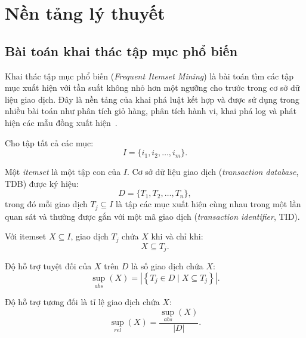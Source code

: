 \section{Nền tảng lý thuyết}
\label{sec:theoretical-background}

\subsection{Bài toán khai thác tập mục phổ biến}

Khai thác tập mục phổ biến (\textit{Frequent Itemset Mining}) là bài toán
tìm các tập mục xuất hiện với tần suất không nhỏ hơn một ngưỡng cho trước trong
cơ sở dữ liệu giao dịch. Đây là nền tảng của khai phá luật kết hợp và được sử
dụng trong nhiều bài toán như phân tích giỏ hàng, phân tích hành vi, khai phá log
và phát hiện các mẫu đồng xuất hiện~\cite{agrawal1994fast,han2011datamining}.

Cho tập tất cả các mục:
\begin{equation}
    I = \{i_1,i_2,\ldots,i_m\}.
    \label{eq:item-universe}
\end{equation}

Một \textit{itemset} là một tập con của $I$. Cơ sở dữ liệu giao dịch
(\textit{transaction database}, TDB) được ký hiệu:
\begin{equation}
    D = \{T_1,T_2,\ldots,T_n\},
    \label{eq:transaction-database}
\end{equation}
trong đó mỗi giao dịch $T_j \subseteq I$ là tập các mục xuất hiện cùng nhau
trong một lần quan sát và thường được gắn với một mã giao dịch
(\textit{transaction identifier}, TID).

Với itemset $X \subseteq I$, giao dịch $T_j$ chứa $X$ khi và chỉ khi:
\begin{equation}
    X \subseteq T_j.
    \label{eq:transaction-contains-itemset}
\end{equation}

Độ hỗ trợ tuyệt đối của $X$ trên $D$ là số giao dịch chứa $X$:
\begin{equation}
    \operatorname{sup}_{abs}(X)
    =
    \left|\left\{T_j \in D \mid X \subseteq T_j\right\}\right|.
    \label{eq:absolute-support}
\end{equation}

Độ hỗ trợ tương đối là tỉ lệ giao dịch chứa $X$:
\begin{equation}
    \operatorname{sup}_{rel}(X)
    =
    \frac{\operatorname{sup}_{abs}(X)}{|D|}.
    \label{eq:relative-support}
\end{equation}

